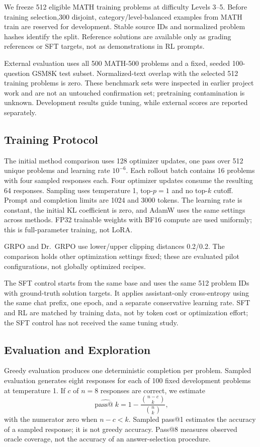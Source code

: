 \documentclass[conference]{IEEEtran}
\begin{document}
We freeze 512 eligible MATH training problems at difficulty Levels 3--5. Before training selection,300 disjoint, category/level-balanced examples from MATH train are reserved for development. Stable source IDs and normalized problem hashes identify the split. Reference solutions are available only as grading references or SFT targets, not as demonstrations in RL prompts.

External evaluation uses all 500 MATH-500 problems and a fixed, seeded 100-question GSM8K test subset. Normalized-text overlap with the selected 512 training problems is zero. These benchmark sets were inspected in earlier project work and are not an untouched confirmation set; pretraining contamination is unknown. Development results guide tuning, while external scores are reported separately.

\subsection{Training Protocol}
The initial method comparison uses 128 optimizer updates, one pass over 512 unique problems and learning rate $10^{-6}$. Each rollout batch contains 16 problems with four sampled responses each. Four optimizer updates consume the resulting 64 responses. Sampling uses temperature 1, top-$p=1$ and no top-$k$ cutoff. Prompt and completion limits are 1024 and 3000 tokens. The learning rate is constant, the initial KL coefficient is zero, and AdamW uses the same settings across methods. FP32 trainable weights with BF16 compute are used uniformly; this is full-parameter training, not LoRA.

GRPO and Dr.~GRPO use lower/upper clipping distances 0.2/0.2. The comparison holds other optimization settings fixed; these are evaluated pilot configurations, not globally optimized recipes.

The SFT control starts from the same base and uses the same 512 problem IDs with ground-truth solution targets. It applies assistant-only cross-entropy using the same chat prefix, one epoch, and a separate conservative learning rate. SFT and RL are matched by training data, not by token cost or optimization effort; the SFT control has not received the same tuning study.

\subsection{Evaluation and Exploration}
Greedy evaluation produces one deterministic completion per problem. Sampled evaluation generates eight responses for each of 100 fixed development problems at temperature 1. If $c$ of $n=8$ responses are correct, we estimate
\begin{equation}
\widehat{\operatorname{pass@}k}=1-\frac{\binom{n-c}{k}}{\binom{n}{k}},
\end{equation}
with the numerator zero when $n-c<k$. Sampled pass@1 estimates the accuracy of a sampled response; it is not greedy accuracy. Pass@8 measures observed oracle coverage, not the accuracy of an answer-selection procedure.
\end{document}

